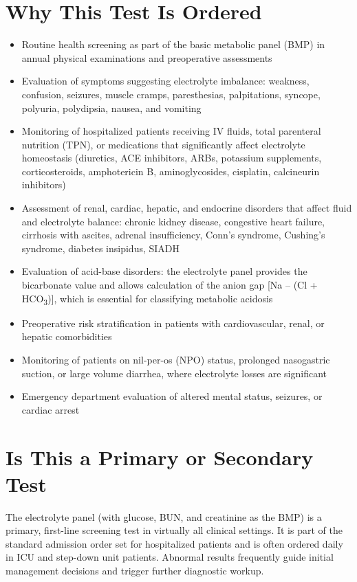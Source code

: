 \section*{Why This Test Is Ordered}
\begin{itemize}
  \item Routine health screening as part of the basic metabolic panel (BMP) in annual physical examinations and preoperative assessments
  \item Evaluation of symptoms suggesting electrolyte imbalance: weakness, confusion, seizures, muscle cramps, paresthesias, palpitations, syncope, polyuria, polydipsia, nausea, and vomiting
  \item Monitoring of hospitalized patients receiving IV fluids, total parenteral nutrition (TPN), or medications that significantly affect electrolyte homeostasis (diuretics, ACE inhibitors, ARBs, potassium supplements, corticosteroids, amphotericin B, aminoglycosides, cisplatin, calcineurin inhibitors)
  \item Assessment of renal, cardiac, hepatic, and endocrine disorders that affect fluid and electrolyte balance: chronic kidney disease, congestive heart failure, cirrhosis with ascites, adrenal insufficiency, Conn's syndrome, Cushing's syndrome, diabetes insipidus, SIADH
  \item Evaluation of acid-base disorders: the electrolyte panel provides the bicarbonate value and allows calculation of the anion gap [Na -- (Cl + HCO\textsubscript{3})], which is essential for classifying metabolic acidosis
  \item Preoperative risk stratification in patients with cardiovascular, renal, or hepatic comorbidities
  \item Monitoring of patients on nil-per-os (NPO) status, prolonged nasogastric suction, or large volume diarrhea, where electrolyte losses are significant
  \item Emergency department evaluation of altered mental status, seizures, or cardiac arrest
\end{itemize}

\section*{Is This a Primary or Secondary Test}
The electrolyte panel (with glucose, BUN, and creatinine as the BMP) is a primary, first-line screening test in virtually all clinical settings. It is part of the standard admission order set for hospitalized patients and is often ordered daily in ICU and step-down unit patients. Abnormal results frequently guide initial management decisions and trigger further diagnostic workup.

